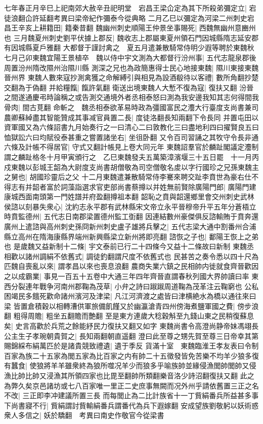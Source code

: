 七年春正月辛巳上祀南郊大赦辛丑祀明堂　宕昌王梁仚定為其下所殺弟彌定立|{
	宕徒浪翻仚許延翻考異曰梁帝紀作彌泰今從典略}
二月乙巳以彌定為河梁二州刺史宕昌王辛亥上耕籍田|{
	籍秦昔翻}
魏幽州刺史順陽王仲景坐事賜死|{
	西魏無幽州意豳州也}
三月魏夏州刺史劉平伏據上郡反|{
	魏收志上郡屬東夏州領石門因城縣隋志延安郡有因城縣夏戶雅翻}
大都督于謹討禽之　夏五月遣兼散騎常侍明少遐等聘於東魏秋七月己卯東魏宜陽王景植卒　魏以侍中宇文測為大都督行汾州事|{
	五代志龍泉郡後周置汾州隋改隰州治隰川縣}
測深之兄也為政簡惠得士民心地接東魏|{
	隰川東接東魏晉州界}
東魏人數來寇抄測禽獲之命解縛引與相見為設酒殽待以客禮|{
	數所角翻抄楚交翻為于偽翻}
并給糧餼|{
	餼許氣翻}
衛送出境東魏人大慙不復為寇|{
	復扶又翻}
汾晉之間遂通慶弔時論稱之或告測交通境外者丞相泰怒曰測為我安邊我知其志何得間我骨肉|{
	間古莧翻}
命斬之　魏丞相泰欲革易時政為彊國富民之灋大行臺度支尚書兼司農卿蘇綽盡其智能贊成其事减官員置二長|{
	度徒洛翻長知兩翻下令長同}
并置屯田以資軍國又為六條詔書九月始奏行之一曰清心二曰敦教化三曰盡地利四曰擢賢良五曰恤獄訟六曰均賦役泰甚重之嘗置諸坐右|{
	坐徂卧翻}
又令百司習誦之其牧守令長非通六條及計帳不得居官|{
	守式又翻計帳見上卷大同元年}
東魏詔羣官於麟趾閣議定灋制謂之麟趾格冬十月甲寅頒行之　乙巳東魏發夫五萬築漳濱堰三十五日罷　十一月丙戍東魏以彭城王韶為大尉度支尚書胡僧敬為司空僧敬名䖍以字行國珍之兄孫東魏主之舅也|{
	胡國珍靈后之父}
十二月東魏遣兼散騎常侍李騫來聘交趾李賁世為豪右仕不得志有并韶者富於詞藻詣選求官吏部尚書蔡撙以并姓無前賢除廣陽門郎|{
	廣陽門建康城西面南頭第一門姓譜并府盈翻撙祖本翻}
韶恥之賁與韶還鄉里會交州刺史武林侯諮以刻暴失衆心|{
	沈約志永平郡有武林縣宋文帝立永平晉穆帝升平五年分蒼梧立}
時賁監德州|{
	五代志日南郡梁置德州監工衘翻}
因連結數州豪傑俱反諮輸賄于賁奔還廣州上遣諮與高州刺史孫冏新州刺史盧子雄將兵擊之|{
	五代志梁大通中割番州合浦縣立高州在隋海康縣界端州新興縣梁立新州將即亮翻}
諮恢之子也|{
	鄱陽王恢上之弟也}
是歲魏又益新制十二條|{
	宇文泰前已行二十四條今又益十二條故曰新制}
東魏丞相歡以諸州調絹不依舊式|{
	調徒釣翻謂尺度不依舊式也}
民甚苦之奏令悉以四十尺為匹魏自喪亂以來|{
	謂孝昌以來也喪息浪翻}
農商失業六鎮之民相帥内徙就食齊晉歡因之以成霸業|{
	事見一百五十五卷中大通三年四年齊晉直謂春秋列國大界帥讀曰率}
東西分裂連年戰争河南州郡鞠為茂草|{
	小弁之詩曰踧踧周道鞠為茂革注云鞠窮也}
公私困竭民多餓死歡命諸州濱河及津梁|{
	凡江河濟渡之處皆曰津横絶水為橋以通往來曰梁}
皆置倉積穀以相轉漕供軍旅備飢饉又於幽瀛滄青四州傍海煮鹽軍國之費|{
	傍步浪翻}
粗得周贍|{
	粗坐五翻贍而艶翻}
至是東方連歲大稔穀斛至九錢山東之民稍復蘇息矣|{
	史言高歡於兵荒之餘能紓民力復扶又翻又如字}
東魏尚書令高澄尚静帝妹馮翊長公主生子孝琬朝貴賀之|{
	長知兩翻朝直遥翻}
澄曰此至尊之甥先賀至尊三日帝幸其第賜錦綵布絹萬匹於是諸貴競致禮遺|{
	遺于季反}
貨滿十室　東魏臨淮王孝友表曰令制百家為族二十五家為閭五家為比百家之内有帥二十五徵發皆免苦樂不均羊少狼多復有蠶食|{
	使狼將羊羊雖衆終為狼所噬况羊少而狼多乎喻族帥並緣侵漁閭帥閭帥又侵漁比帥比帥又浸漁其所領四家也比毘至翻帥所類翻樂音洛少詩沼翻復扶又翻}
此之為弊久矣京邑諸坊或七八百家唯一里正二史庶事無闕而况外州乎請依舊置三正之名不改|{
	三正即李冲建議所置三長}
而每閭止為二比計族省十一丁貲絹番兵所益甚多事下尚書寢不行|{
	貲絹謂討貲輸絹番兵謂番代為兵下遐嫁翻}
安成望族劉敬躬以妖術惑衆人多信之|{
	妖於驕翻　考異曰南史作敬官今從梁書}


